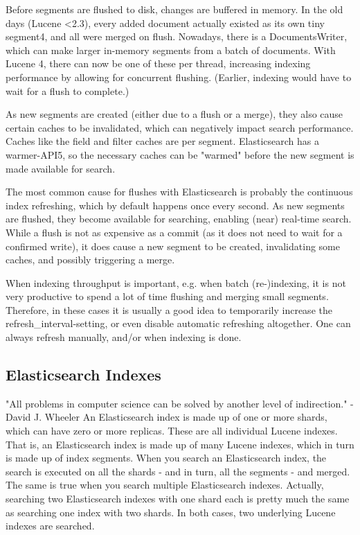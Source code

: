 Before segments are flushed to disk, changes are buffered in memory. In the old days (Lucene <2.3), every added document actually existed as its own tiny segment4, and all were merged on flush. Nowadays, there is a DocumentsWriter, which can make larger in-memory segments from a batch of documents. With Lucene 4, there can now be one of these per thread, increasing indexing performance by allowing for concurrent flushing. (Earlier, indexing would have to wait for a flush to complete.)

As new segments are created (either due to a flush or a merge), they also cause certain caches to be invalidated, which can negatively impact search performance. Caches like the field and filter caches are per segment. Elasticsearch has a warmer-API5, so the necessary caches can be "warmed" before the new segment is made available for search.

The most common cause for flushes with Elasticsearch is probably the continuous index refreshing, which by default happens once every second. As new segments are flushed, they become available for searching, enabling (near) real-time search. While a flush is not as expensive as a commit (as it does not need to wait for a confirmed write), it does cause a new segment to be created, invalidating some caches, and possibly triggering a merge.

When indexing throughput is important, e.g. when batch (re-)indexing, it is not very productive to spend a lot of time flushing and merging small segments. Therefore, in these cases it is usually a good idea to temporarily increase the refresh\_interval-setting, or even disable automatic refreshing altogether. One can always refresh manually, and/or when indexing is done.

\subsection*{Elasticsearch Indexes}

"All problems in computer science can be solved by another level of indirection." - David J. Wheeler
An Elasticsearch index is made up of one or more shards, which can have zero or more replicas. These are all individual Lucene indexes. That is, an Elasticsearch index is made up of many Lucene indexes, which in turn is made up of index segments. When you search an Elasticsearch index, the search is executed on all the shards - and in turn, all the segments - and merged. The same is true when you search multiple Elasticsearch indexes. Actually, searching two Elasticsearch indexes with one shard each is pretty much the same as searching one index with two shards. In both cases, two underlying Lucene indexes are searched.

